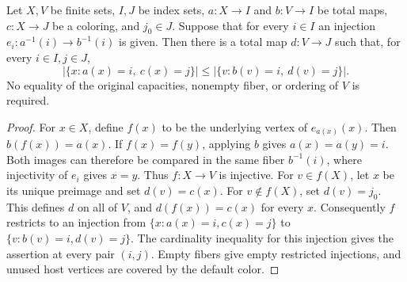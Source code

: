 \begin{lemma}
Let $X,V$ be finite sets, $I,J$ be index sets, $a:X\to I$ and
$b:V\to I$ be total maps, $c:X\to J$ be a coloring, and $j_0\in J$.
Suppose that for every $i\in I$ an injection
$e_i:a^{-1}(i)\to b^{-1}(i)$ is given.
Then there is a total map $d:V\to J$ such that, for every $i\in I,j\in J$,
\[
 |\{x:a(x)=i,\ c(x)=j\}|\leq
 |\{v:b(v)=i,\ d(v)=j\}|.
\]
No equality of the original capacities, nonempty fiber, or ordering of
$V$ is required.
\end{lemma}
\begin{proof}
For $x\in X$, define $f(x)$ to be the underlying vertex of
$e_{a(x)}(x)$.  Then $b(f(x))=a(x)$.
If $f(x)=f(y)$, applying $b$ gives $a(x)=a(y)=i$.
Both images can therefore be compared in the same fiber $b^{-1}(i)$,
where injectivity of $e_i$ gives $x=y$.  Thus $f:X\to V$ is injective.
For $v\in f(X)$, let $x$ be its unique preimage and set $d(v)=c(x)$.
For $v\notin f(X)$, set $d(v)=j_0$.  This defines $d$ on all of $V$,
and $d(f(x))=c(x)$ for every $x$.
Consequently $f$ restricts to an injection from
$\{x:a(x)=i,c(x)=j\}$ to $\{v:b(v)=i,d(v)=j\}$.
The cardinality inequality for this injection gives the assertion at
every pair $(i,j)$.  Empty fibers give empty restricted injections, and
unused host vertices are covered by the default color.
\end{proof}
